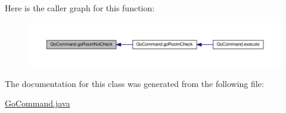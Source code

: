 Here is the caller graph for this function\-:
\nopagebreak
\begin{figure}[H]
\begin{center}
\leavevmode
\includegraphics[width=350pt]{classGoCommand_a3149bf695c19b78c39cfc4dadece7846_icgraph}
\end{center}
\end{figure}




The documentation for this class was generated from the following file\-:\begin{DoxyCompactItemize}
\item 
\hyperlink{GoCommand_8java}{Go\-Command.\-java}\end{DoxyCompactItemize}
